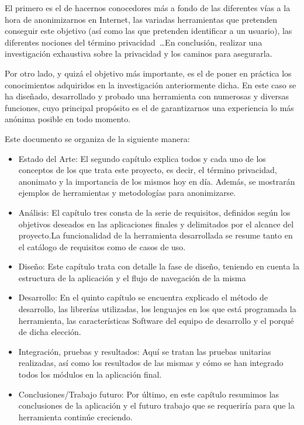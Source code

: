 El primero es el de hacernos conocedores más a fondo de las diferentes vías a la hora de anonimizarnos en Internet, las variadas herramientas que pretenden conseguir este objetivo (así como las que pretenden identificar a un usuario), las diferentes nociones del término privacidad~\cite{article:danezis2010}\dots En conclusión, realizar una investigación exhaustiva sobre la privacidad y los caminos para asegurarla.

Por otro lado, y quizá el objetivo más importante, es el de poner en práctica los conocimientos adquiridos en la investigación anteriormente dicha. En este caso se ha diseñado, desarrollado y probado una herramienta con numerosas y diversas funciones, cuyo principal propósito es el de garantizarnos una experiencia lo más anónima posible en todo momento.



Este documento se organiza de la siguiente manera:
\begin{itemize}
	\item Estado  del  Arte: El segundo capítulo explica todos y cada uno de los conceptos de los que trata este proyecto, es decir, el término privacidad, anonimato y la importancia de los mismos hoy en día. Además, se mostrarán ejemplos de herramientas y metodologías para anonimizarse. 
	\item Análisis: El capítulo tres consta de la serie de requisitos, definidos  según  los objetivos  deseados  en  las  aplicaciones  finales  y  delimitados  por  el  alcance  del proyecto.La funcionalidad de la herramienta desarrollada se resume tanto en el catálogo de requisitos como de casos de uso.
	\item Diseño: Este capítulo trata con detalle la fase de diseño, teniendo en cuenta la estructura de la aplicación y el flujo de navegación de la misma 
	\item Desarrollo: En el quinto capítulo se encuentra explicado el método de desarrollo, las librerías utilizadas, los lenguajes en los que está programada la herramienta, las características Software del equipo de desarrollo y el porqué de dicha elección.
	\item Integración, pruebas y resultados: Aquí se tratan las pruebas unitarias realizadas, así como los resultados de las mismas y cómo se han integrado todos los módulos en la aplicación final.
	\item Conclusiones/Trabajo  futuro: Por último, en este capítulo resumimos las conclusiones de la aplicación y el futuro trabajo que se requeriría para que la herramienta continúe creciendo.
\end{itemize}

\newpage \thispagestyle{empty} %